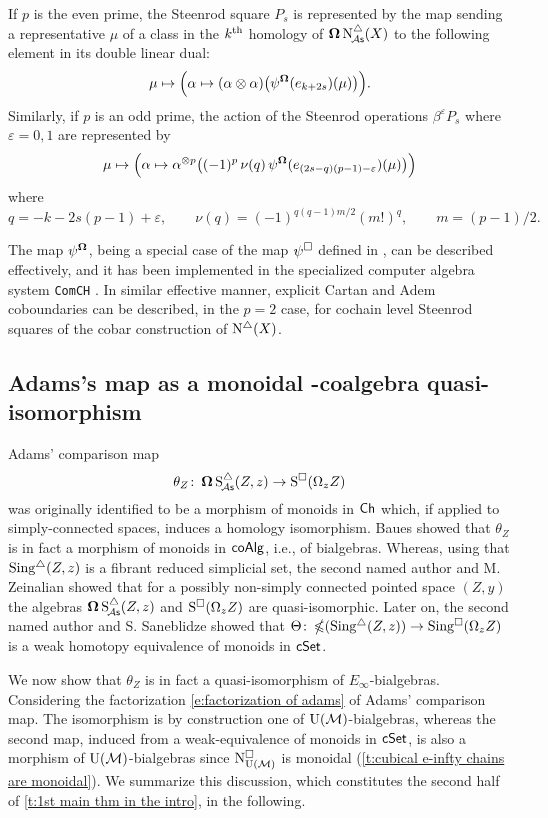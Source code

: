 If $p$ is the even prime, the Steenrod square $P_s$ is represented by the map sending a representative $\mu$ of a class in the $k^{\mathrm{th}}$ homology of $\operatorname{\mathbf{\Omega}} \operatorname{N^{\triangle}_{\!{\mathcal{A}\mathsf{s}}}}(X)$ to the following element in its double linear dual:
\[
\mu \mapsto
\Big( \alpha \mapsto (\alpha \otimes \alpha) \big( \psi^{\operatorname{\mathbf{\Omega}}}(e_{k+2s})(\mu) \big) \Big).
\]
Similarly, if $p$ is an odd prime, the action of the Steenrod operations $\beta^\varepsilon P_{s}$ where $\varepsilon = 0,1$ are represented by
\[
\mu \mapsto
\Big( \alpha \mapsto \alpha^{\otimes p} \big( (-1)^p \, \nu(q) \, \psi^{\operatorname{\mathbf{\Omega}}}(e_{(2s-q)(p-1)-\varepsilon})(\mu) \big) \Big)
\]
where
\[
q = -k -2s(p-1) + \varepsilon, \qquad
\nu(q) = (-1)^{q(q-1)m/2}(m!)^q, \qquad
m = (p-1)/2.
\]

The map $\psi^{\operatorname{\mathbf{\Omega}}}$, being a special case of the map $\psi^\square$ defined in \cite{medina2021may_st}, can be described effectively, and it has been implemented in the specialized computer algebra system \texttt{ComCH} \cite{medina2021comch}.
In similar effective manner, explicit Cartan and Adem coboundaries \cite{medina2020cartan, medina2021adem} can be described, in the $p = 2$ case, for cochain level Steenrod squares of the cobar construction of $\operatorname{N^{\triangle}}(X)$.



\subsection{Adams's map as a monoidal \pdfEinfty-coalgebra quasi-isomorphism}

Adams' comparison map
\[
\theta_Z \colon \operatorname{\mathbf{\Omega}} \operatorname{S^{\triangle}_{\!{\mathcal{A}\mathsf{s}}}}(Z,z) \to \operatorname{S^{\square}}(\Omega_z Z)
\]
was originally identified to be a morphism of monoids in $\mathsf{Ch}$ which, if applied to simply-connected spaces, induces a homology isomorphism.
Baues showed that $\theta_Z$ is in fact a morphism of monoids in $\mathsf{coAlg}$, i.e., of bialgebras.
Whereas, using that $\operatorname{Sing^{\triangle}}(Z,z)$ is a fibrant reduced simplicial set, the second named author and M. Zeinalian \cite{rivera2018cubical} showed that for a possibly non-simply connected pointed space $(Z,y)$ the algebras $\operatorname{\mathbf{\Omega}} \operatorname{S^{\triangle}_{\!{\mathcal{A}\mathsf{s}}}}(Z,z)$ and $\operatorname{S^{\square}}(\Omega_zZ)$ are quasi-isomorphic.
Later on, the second named author and S. Saneblidze
\cite{rivera2019path} showed that $\Theta \colon \operatorname{\mathbb{\Omega}}(\operatorname{Sing^{\triangle}}(Z,z)) \to \operatorname{Sing^{\square}}(\Omega_z Z)$ is a weak homotopy equivalence of monoids in $\mathsf{cSet}$.

We now show that $\theta_Z$ is in fact a quasi-isomorphism of $E_{\infty}$-bialgebras.
Considering the factorization \eqref{e:factorization of adams} of Adams' comparison map.
The isomorphism is by construction one of ${\operatorname{U}(\mathcal{M})}$-bialgebras, whereas the second map, induced from a weak-equivalence of monoids in $\mathsf{cSet}$, is also a morphism of ${\operatorname{U}(\mathcal{M})}$-bialgebras
since $\operatorname{N^{\square}_{{\operatorname{U}(\mathcal{M})}}}$ is monoidal (\cref{t:cubical e-infty chains are monoidal}).
We summarize this discussion, which constitutes the second half of \cref{t:1st main thm in the intro}, in the following.


